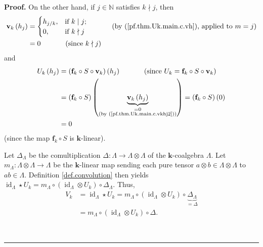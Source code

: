 \documentclass[numbers=enddot,12pt,final,onecolumn,notitlepage]{scrartcl}%
\theoremstyle{definition}
\newenvironment{proof}[1][Proof]{\noindent\textbf{#1.} }{\ \rule{0.5em}{0.5em}}
\begin{document}
\begin{proof}
On the other hand, if $j\in\mathbb{N}$ satisfies $k\nmid j$, then%
\begin{align}
\mathbf{v}_{k}\left(  h_{j}\right)   &  =%
\begin{cases}
h_{j/k}, & \text{if }k\mid j;\\
0, & \text{if }k\nmid j
\end{cases}
\ \ \ \ \ \ \ \ \ \ \left(  \text{by (\ref{pf.thm.Uk.main.c.vh}), applied to
}m=j\right) \nonumber\\
&  =0\ \ \ \ \ \ \ \ \ \ \left(  \text{since }k\nmid j\right)
\label{pf.thm.Uk.main.c.vkhj2}%
\end{align}
and
\begin{align}
U_{k}\left(  h_{j}\right)   &  =\left(  \mathbf{f}_{k}\circ S\circ
\mathbf{v}_{k}\right)  \left(  h_{j}\right)  \ \ \ \ \ \ \ \ \ \ \left(
\text{since }U_{k}=\mathbf{f}_{k}\circ S\circ\mathbf{v}_{k}\right) \nonumber\\
&  =\left(  \mathbf{f}_{k}\circ S\right)  \left(  \underbrace{\mathbf{v}%
_{k}\left(  h_{j}\right)  }_{\substack{=0\\\text{(by
(\ref{pf.thm.Uk.main.c.vkhj2}))}}}\right)  =\left(  \mathbf{f}_{k}\circ
S\right)  \left(  0\right) \nonumber\\
&  =0 \label{pf.thm.Uk.main.c.Ukhj2}%
\end{align}
(since the map $\mathbf{f}_{k}\circ S$ is $\mathbf{k}$-linear).

Let $\Delta_{\Lambda}$ be the comultiplication $\Delta:\Lambda\rightarrow
\Lambda\otimes\Lambda$ of the $\mathbf{k}$-coalgebra $\Lambda$. Let
$m_{\Lambda}:\Lambda\otimes\Lambda\rightarrow\Lambda$ be the $\mathbf{k}%
$-linear map sending each pure tensor $a\otimes b\in\Lambda\otimes\Lambda$ to
$ab\in\Lambda$. Definition \ref{def.convolution} then yields
$\operatorname*{id}\nolimits_{\Lambda}\star U_{k}=m_{\Lambda}\circ\left(
\operatorname*{id}\nolimits_{\Lambda}\otimes U_{k}\right)  \circ
\Delta_{\Lambda}$. Thus,%
\begin{align}
V_{k}  &  =\operatorname*{id}\nolimits_{\Lambda}\star U_{k}=m_{\Lambda}%
\circ\left(  \operatorname*{id}\nolimits_{\Lambda}\otimes U_{k}\right)
\circ\underbrace{\Delta_{\Lambda}}_{=\Delta}\nonumber\\
&  =m_{\Lambda}\circ\left(  \operatorname*{id}\nolimits_{\Lambda}\otimes
U_{k}\right)  \circ\Delta. \label{pf.thm.Uk.main.c.conv-def}%
\end{align}



\end{proof}
\end{document}
